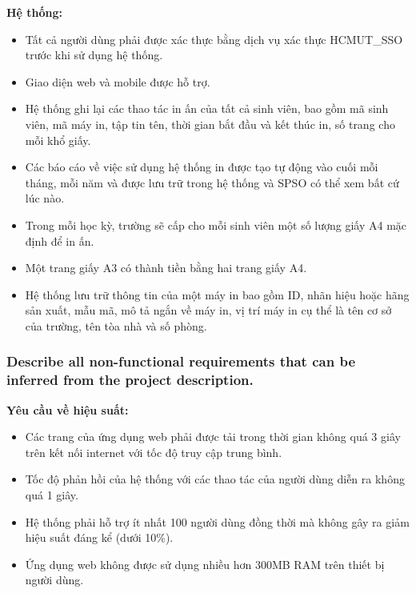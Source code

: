         \textbf{Hệ thống:}
            \begin{itemize}
                \item Tất cả người dùng phải được xác thực bằng dịch vụ xác thực HCMUT\_SSO trước khi sử dụng hệ thống.
                \item Giao diện web và mobile được hỗ trợ.
                \item Hệ thống ghi lại các thao tác in ấn của tất cả sinh viên, bao gồm mã sinh viên, mã máy in, tập tin tên, thời gian bắt đầu và kết thúc in, số trang cho mỗi khổ giấy.
                \item Các báo cáo về việc sử dụng hệ thống in được tạo tự động vào cuối mỗi tháng, mỗi năm và được lưu trữ trong hệ thống và SPSO có thể xem bất cứ lúc nào.
                \item Trong mỗi học kỳ, trường sẽ cấp cho mỗi sinh viên một số lượng giấy A4 mặc định để in ấn.
                \item Một trang giấy A3 có thành tiền bằng hai trang giấy A4.
                \item Hệ thống lưu trữ thông tin của một máy in bao gồm ID, nhãn hiệu hoặc hãng sản xuất, mẫu mã, mô tả ngắn về máy in, vị trí máy in cụ thể là tên cơ sở của trường, tên tòa nhà và số phòng.
            \end{itemize}
    \subsubsection{Describe all non-functional requirements that can be inferred from the project description.}
	\textbf{Yêu cầu về hiệu suất:}
            \begin{itemize}
                \item Các trang của ứng dụng web phải được tải trong thời gian không quá 3 giây trên kết nối internet với tốc độ truy cập trung bình.
                \item Tốc độ phản hồi của hệ thống với các thao tác của người dùng diễn ra không quá 1 giây.
                \item Hệ thống phải hỗ trợ ít nhất 100 người dùng đồng thời mà không gây ra giảm hiệu suất đáng kể (dưới 10\%).
                \item Ứng dụng web không được sử dụng nhiều hơn 300MB RAM trên thiết bị người dùng.
            \end{itemize}
    

